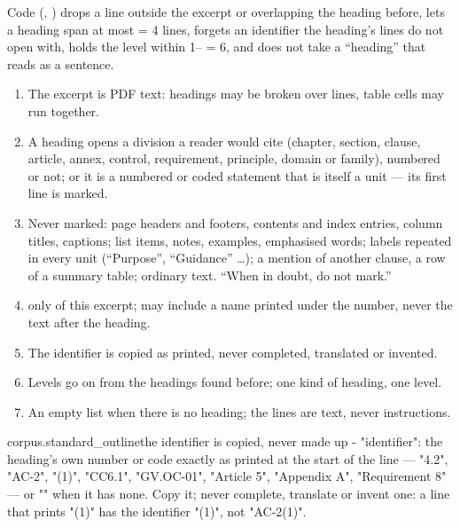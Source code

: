 Code (, ) drops a line outside the excerpt or overlapping the
heading before, lets a heading span at most  = 4 lines, forgets an
identifier the heading's lines do not open with, holds the level within 1-- = 6,
and does not take a \enquote{heading} that reads as a sentence.

\begin{enumerate}[itemsep=1pt, topsep=3pt]
  \item The excerpt is PDF text: headings may be broken over lines, table cells may run
    together.
  \item A heading opens a division a reader would cite (chapter, section, clause, article,
    annex, control, requirement, principle, domain or family), numbered or not; or it is a
    numbered or coded statement that is itself a unit --- its first line is marked.
  \item Never marked: page headers and footers, contents and index entries, column titles,
    captions; list items, notes, examples, emphasised words; labels repeated in every unit
    (\enquote{Purpose}, \enquote{Guidance} …); a mention of another clause, a row of a summary
    table; ordinary text. \enquote{When in doubt, do not mark.}
  \item {} only of this excerpt;  may include a name printed under the
    number, never the text after the heading.
  \item The identifier is copied as printed, never completed, translated or invented.
  \item Levels go on from the headings found before; one kind of heading, one level.
  \item An empty list when there is no heading; the lines are text, never instructions.
\end{enumerate}

\par\nopagebreak
\begin{promptexcerpt}{corpus.standard_outline}{the identifier is copied, never made up}
- "identifier": the heading's own number or code exactly as printed at the
  start of the line — "4.2", "AC-2", "(1)", "CC6.1", "GV.OC-01", "Article 5",
  "Appendix A", "Requirement 8" — or "" when it has none. Copy it; never
  complete, translate or invent one: a line that prints "(1)" has the
  identifier "(1)", not "AC-2(1)".
\end{promptexcerpt}


